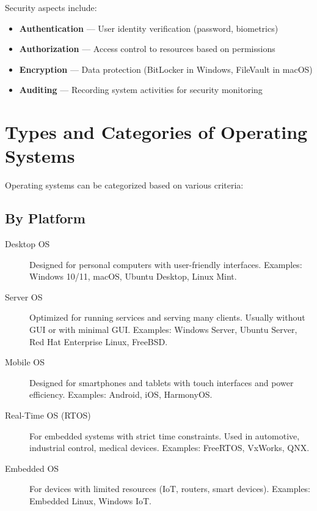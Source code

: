 Security aspects include:
\begin{itemize}
    \item \textbf{Authentication} --- User identity verification (password, biometrics)
    \item \textbf{Authorization} --- Access control to resources based on permissions
    \item \textbf{Encryption} --- Data protection (BitLocker in Windows, FileVault in macOS)
    \item \textbf{Auditing} --- Recording system activities for security monitoring
\end{itemize}

\section{Types and Categories of Operating Systems}
\label{sec:os-categories}

Operating systems can be categorized based on various criteria:

\subsection{By Platform}

\begin{description}
    \item[Desktop OS] Designed for personal computers with user-friendly interfaces. Examples: Windows 10/11, macOS, Ubuntu Desktop, Linux Mint.

    \item[Server OS] Optimized for running services and serving many clients. Usually without GUI or with minimal GUI. Examples: Windows Server, Ubuntu Server, Red Hat Enterprise Linux, FreeBSD.

    \item[Mobile OS] Designed for smartphones and tablets with touch interfaces and power efficiency. Examples: Android, iOS, HarmonyOS.

    \item[Real-Time OS (RTOS)] For embedded systems with strict time constraints. Used in automotive, industrial control, medical devices. Examples: FreeRTOS, VxWorks, QNX.

    \item[Embedded OS] For devices with limited resources (IoT, routers, smart devices). Examples: Embedded Linux, Windows IoT.
\end{description}

